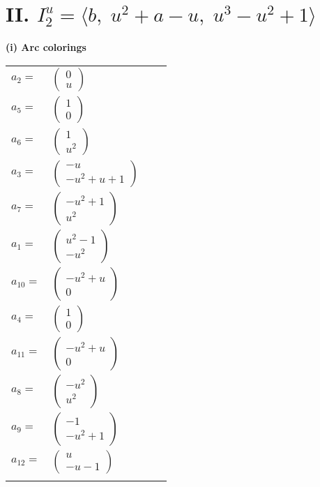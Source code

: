 \documentclass[1p]{elsarticle_modified}
\theoremstyle{definition}
\begin{document}
\centering \section*{II. $I^u_{2}= \langle b,\;u^2+a- u,\;u^3- u^2+1 \rangle$}
\flushleft \textbf{(i) Arc colorings}\\
\begin{tabular}{m{7pt} m{180pt} m{7pt} m{180pt} }
\flushright $a_{2}=$&$\begin{pmatrix}0\\u\end{pmatrix}$ \\
\flushright $a_{5}=$&$\begin{pmatrix}1\\0\end{pmatrix}$ \\
\flushright $a_{6}=$&$\begin{pmatrix}1\\u^2\end{pmatrix}$ \\
\flushright $a_{3}=$&$\begin{pmatrix}- u\\- u^2+u+1\end{pmatrix}$ \\
\flushright $a_{7}=$&$\begin{pmatrix}- u^2+1\\u^2\end{pmatrix}$ \\
\flushright $a_{1}=$&$\begin{pmatrix}u^2-1\\- u^2\end{pmatrix}$ \\
\flushright $a_{10}=$&$\begin{pmatrix}- u^2+u\\0\end{pmatrix}$ \\
\flushright $a_{4}=$&$\begin{pmatrix}1\\0\end{pmatrix}$ \\
\flushright $a_{11}=$&$\begin{pmatrix}- u^2+u\\0\end{pmatrix}$ \\
\flushright $a_{8}=$&$\begin{pmatrix}- u^2\\u^2\end{pmatrix}$ \\
\flushright $a_{9}=$&$\begin{pmatrix}-1\\- u^2+1\end{pmatrix}$ \\
\flushright $a_{12}=$&$\begin{pmatrix}u\\- u-1\end{pmatrix}$\\&\end{tabular}
\end{document}
